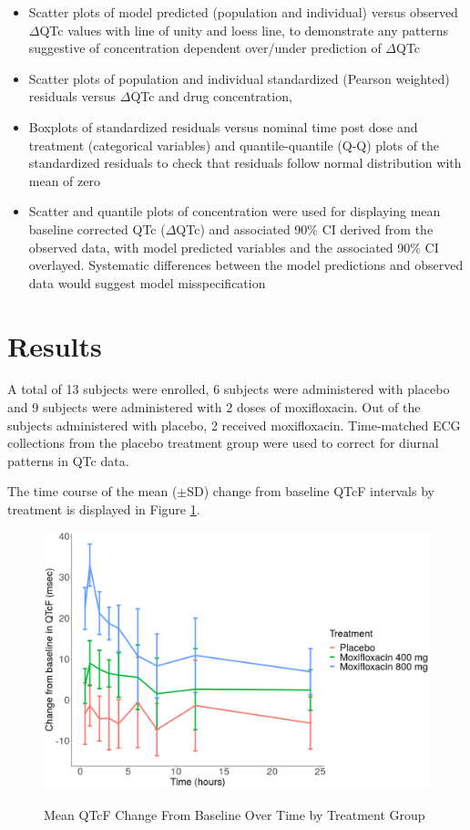 \documentclass[
]{article}
\providecommand{\tightlist}{%
  \setlength{\itemsep}{0pt}\setlength{\parskip}{0pt}}
\begin{document}
\begin{itemize}
\tightlist
\item
  Scatter plots of model predicted (population and individual) versus
  observed \(\Delta\)QTc values with line of unity and loess line, to
  demonstrate any patterns suggestive of concentration dependent
  over/under prediction of \(\Delta\)QTc
\item
  Scatter plots of population and individual standardized (Pearson
  weighted) residuals versus \(\Delta\)QTc and drug concentration,
\item
  Boxplots of standardized residuals versus nominal time post dose and
  treatment (categorical variables) and quantile-quantile (Q-Q) plots of
  the standardized residuals to check that residuals follow normal
  distribution with mean of zero
\item
  Scatter and quantile plots of concentration were used for displaying
  mean baseline corrected QTc (\(\Delta\)QTc) and associated 90\% CI
  derived from the observed data, with model predicted variables and the
  associated 90\% CI overlayed. Systematic differences between the model
  predictions and observed data would suggest model misspecification
\end{itemize}

\hypertarget{results}{%
\section{Results}\label{results}}

A total of 13 subjects were enrolled, 6 subjects were administered with
placebo and 9 subjects were administered with 2 doses of moxifloxacin.
Out of the subjects administered with placebo, 2 received moxifloxacin.
Time-matched ECG collections from the placebo treatment group were used
to correct for diurnal patterns in QTc data.

The time course of the mean (\(\pm\)SD) change from baseline QTcF
intervals by treatment is displayed in Figure
\ref{fig:DQTCFbytreatment}.

\begin{figure}[H]
\caption{Mean QTcF Change From Baseline Over Time by Treatment Group} 
\includegraphics[width=\textwidth]{../Report/Figures/DQTCFbytreatment.png}
\label{fig:DQTCFbytreatment}
\end{figure}
\end{document}
